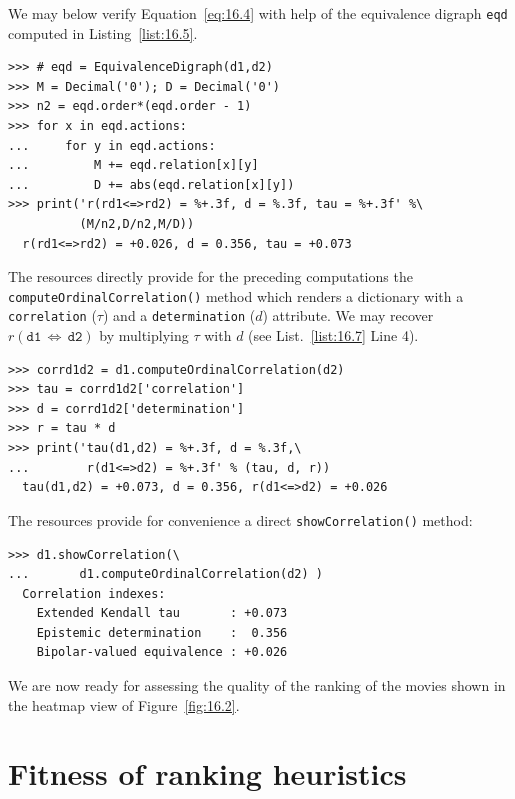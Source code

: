 We may below verify Equation~\vref{eq:16.4} with help of the equivalence digraph \texttt{eqd} computed in Listing~\vref{list:16.5}.
\begin{lstlisting}[caption={Computing the ordinal correlation index from the equivalence digraph},label=list:16.6]
>>> # eqd = EquivalenceDigraph(d1,d2)
>>> M = Decimal('0'); D = Decimal('0')
>>> n2 = eqd.order*(eqd.order - 1)
>>> for x in eqd.actions:
...     for y in eqd.actions:
...         M += eqd.relation[x][y]
...         D += abs(eqd.relation[x][y])
>>> print('r(rd1<=>rd2) = %+.3f, d = %.3f, tau = %+.3f' %\
          (M/n2,D/n2,M/D))   
  r(rd1<=>rd2) = +0.026, d = 0.356, tau = +0.073  
\end{lstlisting}

The \Digraph resources directly provide for the preceding computations the \texttt{compute\-OrdinalCorrelation()} method which renders a dictionary with a \texttt{correlation} ($\tau$) and a \texttt{determina\-tion} ($d$) attribute. We may recover $r(\mathtt{d1}\,\Leftrightarrow\, \mathtt{d2})$ by multiplying $\tau$ with $d$ (see List.~\vref{list:16.7} Line 4). 
\begin{lstlisting}[caption={Computing the valued ordinal correlation index},label=list:16.7]
>>> corrd1d2 = d1.computeOrdinalCorrelation(d2)
>>> tau = corrd1d2['correlation']
>>> d = corrd1d2['determination']
>>> r = tau * d
>>> print('tau(d1,d2) = %+.3f, d = %.3f,\
...        r(d1<=>d2) = %+.3f' % (tau, d, r))
  tau(d1,d2) = +0.073, d = 0.356, r(d1<=>d2) = +0.026
\end{lstlisting}

The \Digraph resources provide for convenience a direct \texttt{showCorrela\-tion()} method:
\begin{lstlisting}
>>> d1.showCorrelation(\
...       d1.computeOrdinalCorrelation(d2) )
  Correlation indexes:
    Extended Kendall tau       : +0.073
    Epistemic determination    :  0.356
    Bipolar-valued equivalence : +0.026
\end{lstlisting}

We are now ready for assessing the quality of the \NetFlows ranking of the movies shown in the heatmap view of Figure~\vref{fig:16.2}. 

\section{Fitness of ranking heuristics}
\label{sec:16.3}


